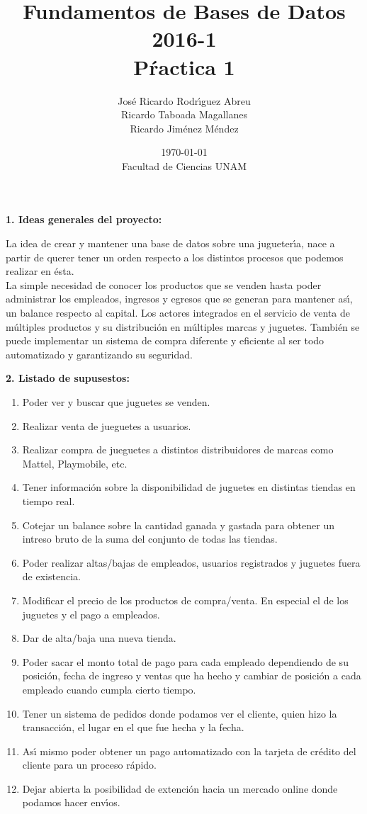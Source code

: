 \documentclass[letterpaper,11pt]{article}
\title{Fundamentos de Bases de Datos 2016-1\\Pŕactica 1}
\author{Jos\'e Ricardo Rodr\'{\i}guez Abreu \\ Ricardo Taboada Magallanes \\ Ricardo Jim\'enez M\'endez}
\date{\today\\ Facultad de Ciencias UNAM}
\begin{document}
 
 \maketitle

 \begin{center}
   {\bf 1. Ideas generales del proyecto:} 
 \end{center}
 La idea de crear y mantener una base de datos sobre una jugueter\'{\i}a, nace a partir de querer tener un orden respecto a los distintos procesos que podemos realizar en \'esta. \\
 La simple necesidad de conocer los productos que se venden hasta poder administrar los empleados, ingresos y egresos que se generan para mantener as\'{\i}, un balance respecto al capital. Los actores integrados en el servicio de venta de m\'ultiples productos y su distribuci\'on en m\'ultiples marcas y juguetes. Tambi\'en se puede implementar un sistema de compra diferente y eficiente al ser todo automatizado y garantizando su seguridad.

 \begin{center}
   {\bf 2. Listado de supusestos:}
 \end{center}
 
 \begin{enumerate}
 \item Poder ver y buscar que juguetes se venden.
 \item Realizar venta de jueguetes a usuarios.
 \item Realizar compra de jueguetes a distintos distribuidores de marcas como Mattel, Playmobile, etc.
 \item Tener informaci\'on sobre la disponibilidad de juguetes en distintas tiendas en tiempo real.
 \item Cotejar un balance sobre la cantidad ganada y gastada para obtener un intreso bruto de la suma del conjunto de todas las tiendas.
 \item Poder realizar altas/bajas de empleados, usuarios registrados y juguetes fuera de existencia.
 \item Modificar el precio de los productos de compra/venta. En especial el de los juguetes y el pago a empleados.
 \item Dar de alta/baja una nueva tienda.
 \item Poder sacar el monto total de pago para cada empleado dependiendo de su posici\'on, fecha de ingreso y ventas que ha hecho y cambiar de posici\'on a cada empleado cuando cumpla cierto tiempo.
 \item Tener un sistema de pedidos donde podamos ver el cliente, quien hizo la transacci\'on, el lugar en el que fue hecha y la fecha.
 \item As\'{\i} mismo poder obtener un pago automatizado con la tarjeta de cr\'edito del cliente para un proceso r\'apido.
 \item Dejar abierta la posibilidad de extenci\'on hacia un mercado online donde podamos hacer env\'{\i}os. 
 \end{enumerate}
\end{document}
